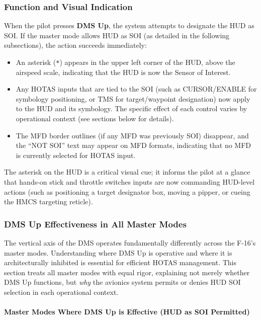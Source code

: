 \documentclass[11pt,a4paper]{article}
\begin{document}
\subsubsection{Function and Visual Indication}

When the pilot presses \textbf{DMS Up}, the system attempts to designate the HUD as SOI. If the master mode allows HUD as SOI (as detailed in the following subsections), the action succeeds immediately:

\begin{itemize}

\item An asterisk (\texttt{*}) appears in the upper left corner of the HUD, above the airspeed scale, indicating that the HUD is now the Sensor of Interest.

\item Any HOTAS inputs that are tied to the SOI (such as CURSOR/ENABLE for symbology positioning, or TMS for target/waypoint designation) now apply to the HUD and its symbology. The specific effect of each control varies by operational context (see sections below for details).

\item The MFD border outlines (if any MFD was previously SOI) disappear, and the ``NOT SOI'' text may appear on MFD formats, indicating that no MFD is currently selected for HOTAS input.

\end{itemize}

The asterisk on the HUD is a critical visual cue; it informs the pilot at a glance that hands-on stick and throttle switches inputs are now commanding HUD-level actions (such as positioning a target designator box, moving a pipper, or cueing the HMCS targeting reticle).

\subsubsection{DMS Up Effectiveness in All Master Modes}

The vertical axis of the DMS operates fundamentally differently across the F-16's master modes. Understanding where DMS Up is operative and where it is architecturally inhibited is essential for efficient HOTAS management. This section treats all master modes with equal rigor, explaining not merely whether DMS Up functions, but \textit{why} the avionics system permits or denies HUD SOI selection in each operational context.

\paragraph*{Master Modes Where DMS Up is Effective (HUD as SOI Permitted)}
\end{document}
